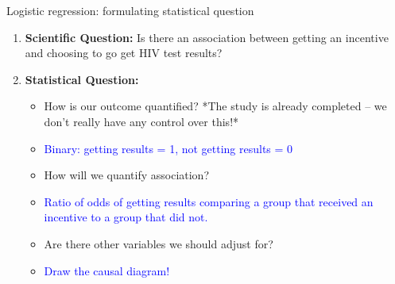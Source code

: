 \documentclass[10pt,t]{beamer}
\begin{document}
\begin{frame}{Logistic regression: formulating statistical question}


	
	\medskip
	
	\begin{enumerate}
		\item \textbf{Scientific Question:}  Is there an association between getting an incentive and choosing to go get HIV test results?
		
		\medskip
		
		\item \textbf{Statistical Question:} 
		\medskip
		  
		\begin{itemize}
			\item How is our outcome quantified? *The study is already completed -- we don't really have any control over this!* 
			
			\medskip
			
			\item[] \textcolor{blue}{Binary: getting results = 1, not getting results = 0} 
			
			\medskip
			
			\item How will we quantify association?  
			
			\medskip
			
			\item[] \textcolor{blue}{Ratio of odds of getting results comparing a group that received an incentive to a group that did not.} 
			
			\medskip
			
			\item Are there other variables we should adjust for? 
			
			\medskip
			
			\item[] \textcolor{blue}{Draw the causal diagram!} 
		\end{itemize}
	\end{enumerate}
\end{frame}
\end{document}
